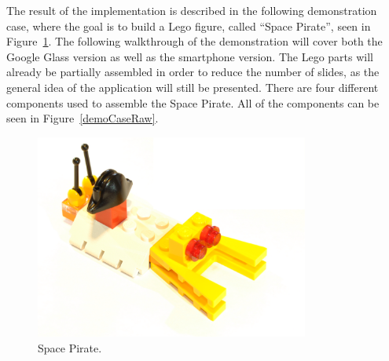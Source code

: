 The result of the implementation is described in the following demonstration case, where the goal is to build a Lego figure, called ``Space Pirate'', seen in Figure~\ref{demoCaseGoal}. The following walkthrough of the demonstration will cover both the Google Glass version as well as the smartphone version. The Lego parts will already be partially assembled in order to reduce the number of slides, as the general idea of the application will still be presented. There are four different components used to assemble the Space Pirate. All of the components can be seen in Figure~\ref{demoCaseRaw}.

	\begin{figure}[H]%
		\centering
		\includegraphics[width=90mm]{images/rawImages/BILD_6}
		\caption{Space Pirate.}
		\label{demoCaseGoal}
	\end{figure}


